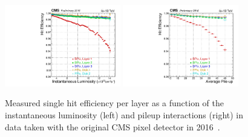 \begin{figure}
\centering
\includegraphics[width=0.45\textwidth]{figures/lhc_and_cms/pixel_efficiency_vs_lumi_2016.pdf}
\hspace{5 mm}
\includegraphics[width=0.45\textwidth]{figures/lhc_and_cms/pixel_efficiency_vs_pu_2016.pdf}
\caption{Measured single hit efficiency per layer as a function of the instantaneous luminosity (left) and pileup interactions (right) in data taken with the original CMS pixel detector in 2016~\cite{pixel_performance_plots_2016}.}
\label{pixel_efficiency_2016}
\end{figure}